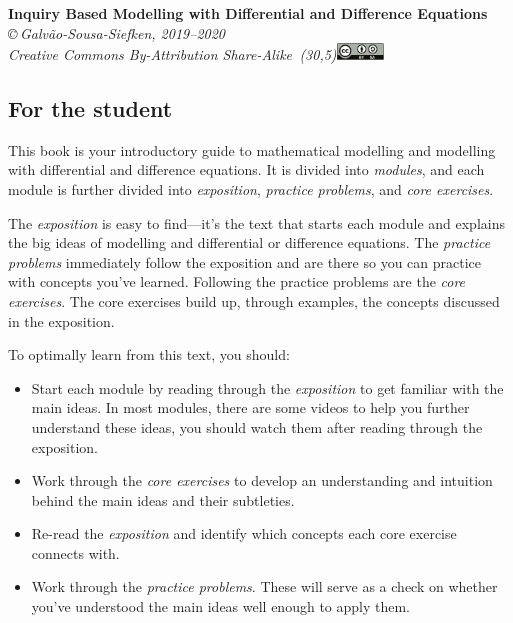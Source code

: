\begin{center}
{\huge\bf Inquiry Based Modelling with Differential and Difference Equations}\\

\vspace{.7in}
{
\it \copyright\,Galv\~ao-Sousa-Siefken, 2019--2020 \\
Creative Commons By-Attribution Share-Alike\, \makebox(30,5){\includegraphics[height=1.2em]{by-sa.pdf}}
}
\end{center}


\subsection*{For the student}

This book is your introductory guide to mathematical modelling and modelling with differential and difference equations. It is divided into
\emph{modules}, and each module is further divided into \emph{exposition},
\emph{practice problems}, and \emph{core exercises}.

The \emph{exposition} is easy to find---it's the text that starts each
module and explains the big ideas of modelling and differential or difference equations. The \emph{practice
problems} immediately follow the exposition and are there so you can
practice with concepts you've learned.  Following the practice problems
are the \emph{core exercises}. The core exercises build up, through
examples, the concepts discussed in the exposition.

To optimally learn from this text, you should:
\begin{itemize}
	\item Start each module by reading through the \emph{exposition} to get familiar with the main ideas. In most modules, there are some videos to help you further understand these ideas, you should watch them after reading through the exposition.

	\item Work through the \emph{core exercises} to develop an understanding and intuition behind the main ideas and their subtleties.

	\item Re-read the \emph{exposition} and identify which concepts each core exercise connects with.

	\item Work through the \emph{practice problems}. These will serve as a check on whether you've understood the main ideas well enough to apply them.
\end{itemize}

